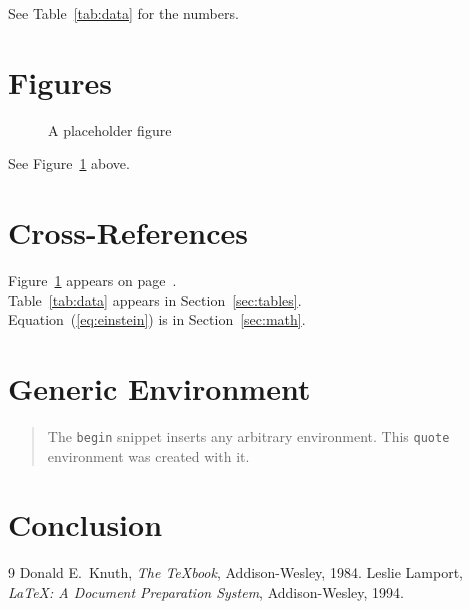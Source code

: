 \documentclass{article}
\begin{document}
See Table~\ref{tab:data} for the numbers.


\section{Figures}
\label{sec:figures}

\begin{figure}[htp]
    \centering
    \fbox{\rule{0pt}{4cm}\rule{8cm}{0pt}}
    \caption{A placeholder figure}
    \label{fig:placeholder}
\end{figure}

See Figure~\ref{fig:placeholder} above.


\section{Cross-References}
\label{sec:refs}

Figure~\ref{fig:placeholder} appears on page~\pageref{fig:placeholder}.\\
Table~\ref{tab:data} appears in Section~\ref{sec:tables}.\\
Equation~(\ref{eq:einstein}) is in Section~\ref{sec:math}.


\section{Generic Environment}
\label{sec:env}

\begin{quote}
    The \texttt{begin} snippet inserts any arbitrary environment.
    This \texttt{quote} environment was created with it.
\end{quote}


\section{Conclusion}
\label{sec:conclusion}

\lipsum[5]

\begin{thebibliography}{9}
        Donald E.\ Knuth,
        \textit{The \TeX{}book},
        Addison-Wesley, 1984.
        Leslie Lamport,
        \textit{\LaTeX: A Document Preparation System},
        Addison-Wesley, 1994.
\end{thebibliography}
\end{document}
